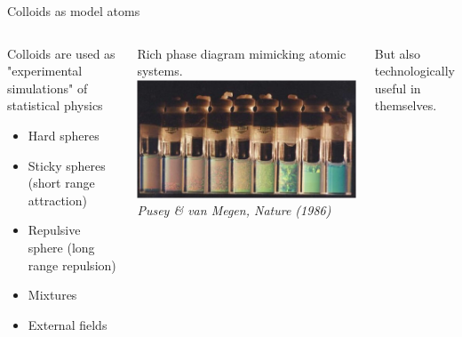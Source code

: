\documentclass[xcolor=table]{beamer}
\begin{document}
\begin{frame}{Colloids as model atoms}
	\begin{columns}
	\begin{block}{Colloids are used as "experimental simulations" of statistical physics}
	\begin{itemize}
	\item Hard spheres
	\item Sticky spheres (short range attraction)
	\item Repulsive sphere (long range repulsion)
	\item Mixtures
	\item External fields
	\end{itemize}
	\end{block}
	
	Rich phase diagram mimicking atomic systems.
	\includegraphics[width=\columnwidth]{Pusey_vanMegen}\\
	\footnotesize{\it Pusey \& van Megen, Nature (1986)}
	
	But also technologically useful in themselves.
	\end{columns}
\end{frame}
\end{document}
